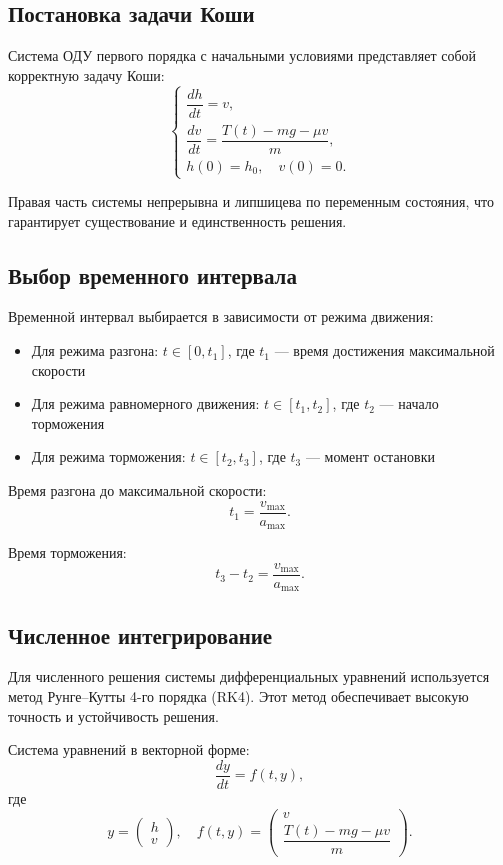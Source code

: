 \documentclass[a4paper, 14pt]{extarticle}
\begin{document}
\subsection{Постановка задачи Коши}
Система ОДУ первого порядка с начальными условиями представляет собой корректную задачу Коши:
\[
\begin{cases}
  \dfrac{dh}{dt} = v,\\
  \dfrac{dv}{dt} = \dfrac{T(t) - mg - \mu v}{m},\\
  h(0) = h_0, \quad v(0) = 0.
\end{cases}
\]

Правая часть системы непрерывна и липшицева по переменным состояния, что гарантирует существование и единственность решения.

\subsection{Выбор временного интервала}
Временной интервал выбирается в зависимости от режима движения:
\begin{itemize}
  \item Для режима разгона: $t \in [0, t_1]$, где $t_1$ — время достижения максимальной скорости
  \item Для режима равномерного движения: $t \in [t_1, t_2]$, где $t_2$ — начало торможения
  \item Для режима торможения: $t \in [t_2, t_3]$, где $t_3$ — момент остановки
\end{itemize}

Время разгона до максимальной скорости:
\[
t_1 = \frac{v_{\max}}{a_{\max}}.
\]

Время торможения:
\[
t_3 - t_2 = \frac{v_{\max}}{a_{\max}}.
\]

\subsection{Численное интегрирование}
Для численного решения системы дифференциальных уравнений используется метод Рунге--Кутты 4-го порядка (RK4). Этот метод обеспечивает высокую точность и устойчивость решения.

Система уравнений в векторной форме:
\[
\frac{dy}{dt} = f(t, y),
\]
где
\[
y = \begin{pmatrix} h \\ v \end{pmatrix}, \quad f(t, y) = \begin{pmatrix} v \\ \dfrac{T(t) - mg - \mu v}{m} \end{pmatrix}.
\]
\end{document}

